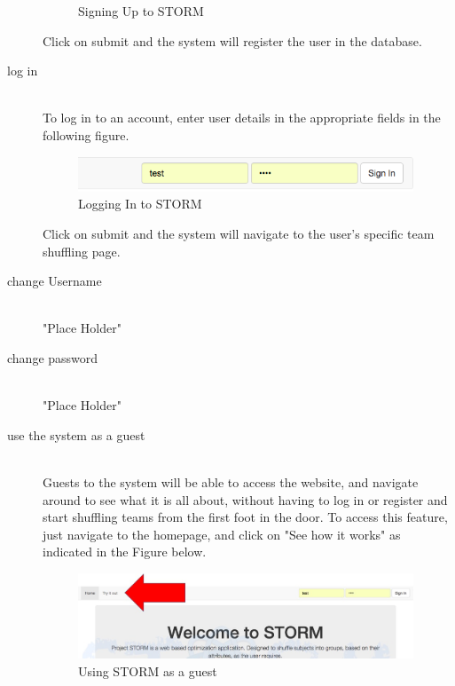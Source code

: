 \begin{description}
\begin{figure}[H]
		 \caption{Signing Up to STORM}
		 \end{figure}
   		Click on submit and the system will register the user in the database.
	\item[log in] \hfill \\
 		To log in to an account, enter user details in the appropriate fields in the following figure.\par
   		\begin{figure}[H] 
		\centering 
		\includegraphics[width=10cm]{./graphics/StormUMSU2.jpg}
		\caption{Logging In to STORM}
		\end{figure}
   		Click on submit and the system will navigate to the user's specific team shuffling page.
    	\item[change Username] \hfill \\
 		"Place Holder"
	\item[change password] \hfill \\
 		"Place Holder"
	\item[use the system as a guest] \hfill \\
 		Guests to the system will be able to access the website, and navigate around to see what it
		is all about, without having to log in or register and start shuffling teams from the first foot in 		the door. To access this feature, just navigate to the homepage, and click on "See how it 			works" as indicated in the Figure below.\par
		\begin{figure}[H] 
		\centering  
		\includegraphics[width=10cm]{./graphics/TryOut.jpg}
		\caption{Using STORM as a guest}
		\end{figure}
				
\end{description}